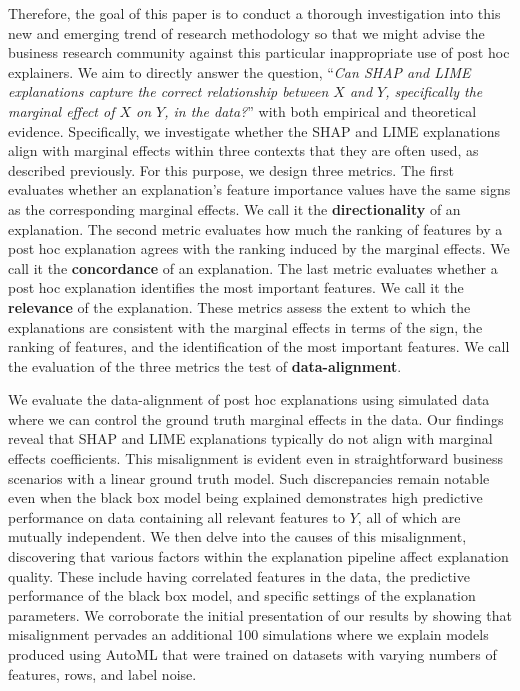\documentclass[mnsc,blindrev]{informs3}
\begin{document}
Therefore, the goal of this paper is to conduct a thorough investigation into this new and emerging trend of research methodology so that we might advise the business research community
against this particular inappropriate use of post hoc explainers. We aim to directly answer the question, %
``\emph{Can SHAP and LIME explanations capture the correct relationship between $X$ and $Y$, specifically the marginal effect of $X$ on $Y$, in the data?}''
with both empirical and theoretical evidence.  Specifically, we investigate whether the SHAP and LIME explanations align with marginal effects within three contexts that they are often used, as described previously. For this purpose, we design three metrics. The first evaluates whether an explanation's feature importance values have the same signs as the corresponding marginal effects. We call it the \textbf{directionality} of an explanation. The second metric evaluates how much the ranking of features by a post hoc explanation agrees with the ranking induced by the marginal effects. We call it the \textbf{concordance} of an explanation. The last metric evaluates whether a post hoc explanation identifies the most important features. We call it the \textbf{relevance} of the explanation. These metrics assess the extent to which the explanations are consistent with the marginal effects in terms of the sign, the ranking of features, and the identification of the most important features. We call the evaluation of the three metrics the test of \textbf{data-alignment}.

We evaluate the data-alignment of post hoc explanations using simulated data where we can control the ground truth marginal effects in the data. Our findings reveal that SHAP and LIME explanations typically do not align with marginal effects coefficients. This misalignment is evident even in straightforward business scenarios with a linear ground truth model. Such discrepancies remain notable even when the black box model being explained demonstrates high predictive performance on data containing all relevant features to $Y$, all of which are mutually independent. We then delve into the causes of this misalignment, discovering that various factors within the explanation pipeline affect explanation quality. These include having correlated features in the data, the predictive performance of the black box model, and specific settings of the explanation parameters. We corroborate the initial presentation of our results by showing that misalignment pervades an additional 100 simulations where we explain models produced using AutoML that were trained on datasets with varying numbers of features, rows, and label noise.
\end{document}
